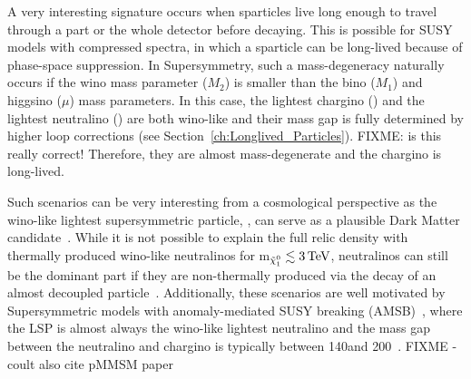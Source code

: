 A very interesting signature occurs when sparticles live long enough to travel through a part or the whole detector before decaying.
This is possible for SUSY models with compressed spectra, in which a sparticle can be long-lived because of phase-space suppression.
In Supersymmetry, such a mass-degeneracy naturally occurs if the wino mass parameter ($M_2$) is smaller than the bino ($M_1$) and higgsino ($\mu$) mass parameters.
In this case, the lightest chargino (\chipm) and the lightest neutralino (\chiO) are both wino-like and their mass gap is fully determined by higher loop corrections (see Section~\ref{ch:Longlived_Particles}). FIXME: is this really correct!
Therefore, they are almost mass-degenerate and the chargino is long-lived.

Such scenarios can be very interesting from a cosmological perspective as the wino-like lightest supersymmetric particle, \chiO, can serve as a plausible Dark Matter candidate~\cite{bib:Ibe:DarkMatter_2015,bib:Hisano:DarkMatter_2005}.
While it is not possible to explain the full relic density with thermally produced wino-like neutralinos for m$_{\tilde{\chi}^{0}_{1}}\lesssim 3\,\text{Te}\kern-0.06667em\text{V}$, neutralinos can still be the dominant part if they are non-thermally produced via the decay of an almost decoupled particle~\cite{bib:Moroi:DarkMatter_1999,bib:Moroi:DarkMatter_2013}.
Additionally, these scenarios are well motivated by Supersymmetric models with anomaly-mediated SUSY breaking (AMSB)~\cite{bib:Theory_AMSB_1998,bib:Theory_AMSB_1999}, where the LSP is almost always the wino-like lightest neutralino and the mass gap between the neutralino and chargino is typically between 140\mev and 200\mev~\cite{bib:Theory_MassGap_2014}. FIXME - coult also cite pMMSM paper\\

